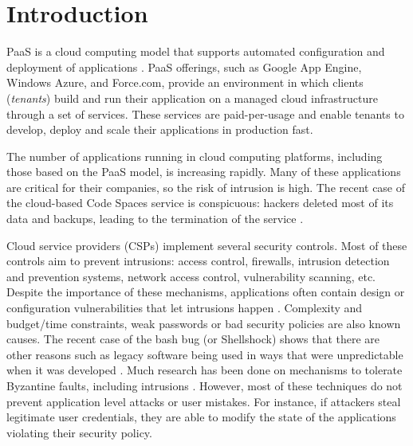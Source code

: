 
\section{Introduction}
\label{sec:introduction}

\acf{PaaS} is a cloud computing model that supports automated configuration and deployment of applications \cite{Vaquero2008,Vaquero2011}. \ac{PaaS} offerings, such as Google App Engine, Windows Azure, and Force.com, provide an environment in which clients (\textit{tenants}) build and run their application on a managed cloud infrastructure through a set of services. These services are paid-per-usage and enable tenants to develop, deploy and scale their applications in production fast.

The number of applications running in cloud computing platforms, including those based on the \ac{PaaS} model, is increasing rapidly. Many of these applications are critical for their companies, so the risk of intrusion is high. The recent case of the cloud-based Code Spaces service is conspicuous: hackers deleted most of its data and backups, leading to the termination of the service \cite{McAllister:14}.


Cloud service providers (CSPs) implement several security controls. Most of these controls aim to prevent intrusions: access control, firewalls, intrusion detection and prevention systems, network access control, vulnerability scanning, etc. Despite the importance of these mechanisms, applications often contain design or configuration vulnerabilities that let intrusions happen \cite{Williams2013}. Complexity and budget/time constraints, weak passwords or bad security policies are also known causes. The recent case of the bash bug (or Shellshock) shows that there are other reasons such as legacy software being used in ways that were unpredictable when it was developed \cite{Sidhpurwala:14}.
Much research has been done on mechanisms to tolerate Byzantine faults, including intrusions \cite{Verissimo2003}. However, most of these techniques do not prevent application level attacks or user mistakes. For instance, if attackers steal legitimate user credentials, they are able to modify the state of the applications violating their security policy. 


